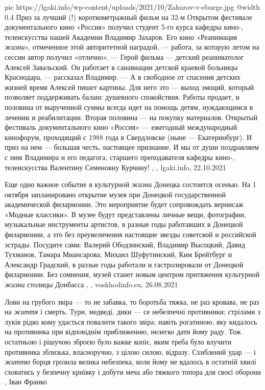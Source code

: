 \ifcmt
  pic https://lgaki.info/wp-content/uploads/2021/10/Zaharov-v-eburge.jpg
  @width 0.4
\fi
Приз за лучший (!) короткометражный фильм на 32-м Открытом фестивале
документального кино «Россия» получил студент 5-го курса кафедры кино-,
телеискусства нашей Академии Владимир Захаров. Его кино «Реанимация
\emph{жизни}», отмеченное этой авторитетной наградой, — работа, за которую
летом на сессии автор получил «отлично».  — Герой фильма — детский реаниматолог
Алексей Завальский. Он работает в санавиации детской краевой больницы
Краснодара, — рассказал Владимир. — А в свободное от спасения детских жизней
время Алексей пишет картины. Для него это — выход эмоций, который позволяет
поддерживать баланс душевного спокойствия. Работы продает, и половина от
вырученной суммы всегда идет на помощь детям, нуждающимся в лечении и
реабилитации. Вторая половина — на покупку материалов.  Открытый фестиваль
документального кино «Россия» — ежегодный международный кинофорум, проходящий с
1988 года в Свердловске (ныне — Екатеринбург). И приз на нем — большая честь,
настоящее признание. И мы от души поздравляем с ним Владимира и его педагога,
старшего преподавателя кафедры кино-, телеискусства Валентину Семеновну
Курчину!
, , lgaki.info, 22.10.2021

Еще одно важное событие в культурной \emph{жизни} Донецка состоится осенью. На
1 октября запланировано открытие музея при Донецкой государственной
академической филармонии. Это мероприятие будет сопровождать вернисаж «Модные
классики».  В музее будут представлены личные вещи, фотографии, музыкальные
инструменты артистов, в разные годы работавших в Донецкой филармонии, а это без
преувеличения настоящие звезды советской и российской эстрады. Посудите сами:
Валерий Ободзинский, Владимир Высоцкий, Давид Тухманов, Тамара Миансарова,
Михаил Шуфутинский, Ким Брейтбург и Александр Градский, в раззые годы работали
и гастролировали от Донецкой филармонии.  Без сомнения, музей станет новым
центром притяжения культурной \emph{жизни} столицы Донбасса
, , voskhodinfo.su, 26.08.2021

Лови на грубого звіра — то не забавка, то боротьба тяжка, не раз кровава, не
раз на \emph{життя} і смерть. Тури, медведі, дики — се небезпечні противники; стрілами
з луків рідко кому удасться повалити такого звіра; навіть рогатиною, яку
кидалось на противника при відповіднім приближенню, нелегко дати йому раду. Тож
остатньою і рішучою зброєю було важке копіє, яким треба було влучити противника
зблизька, власноручно, з цілою силою, відразу. Схиблений удар — і \emph{життю} борця
грозила велика небезпека, коли йому не вдалось в остатній хвилі сховатись у
безпечну криївку і добути меча або тяжкого топора для своєї оборони
, Іван Франко
